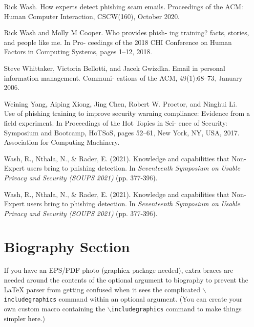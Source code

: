\documentclass[lettersize,journal]{IEEEtran}
\begin{document}
\begin{thebibliography}{1}
  Rick Wash. How experts detect phishing scam emails. Proceedings of the ACM: Human Computer Interaction, CSCW(160), October 2020.

  Rick Wash and Molly M Cooper. Who provides phish-
  ing training? facts, stories, and people like me. In Pro-
  ceedings of the 2018 CHI Conference on Human Factors
  in Computing Systems, pages 1–12, 2018.

  Steve Whittaker, Victoria Bellotti, and Jacek Gwizdka.
  Email in personal information management. Communi-
  cations of the ACM, 49(1):68–73, January 2006.

  Weining Yang, Aiping Xiong, Jing Chen, Robert W.
  Proctor, and Ninghui Li. Use of phishing training to
  improve security warning compliance: Evidence from a
  field experiment. In Proceedings of the Hot Topics in Sci-
  ence of Security: Symposium and Bootcamp, HoTSoS,
  pages 52–61, New York, NY, USA, 2017. Association
  for Computing Machinery.

  Wash, R., Nthala, N., & Rader, E. (2021). Knowledge and capabilities that {Non-Expert} users bring to phishing detection. In \textit{Seventeenth Symposium on Usable Privacy and Security (SOUPS 2021)} (pp. 377-396).

  Wash, R., Nthala, N., & Rader, E. (2021). Knowledge and capabilities that {Non-Expert} users bring to phishing detection. In \textit{Seventeenth Symposium on Usable Privacy and Security (SOUPS 2021)} (pp. 377-396).

\end{thebibliography}

\newpage

\section{Biography Section}
If you have an EPS/PDF photo (graphicx package needed), extra braces are needed
around the contents of the optional argument to biography to prevent the LaTeX
parser from getting confused when it sees the complicated
$\backslash${\tt{includegraphics}} command within an optional argument. (You
can create your own custom macro containing the
$\backslash${\tt{includegraphics}} command to make things simpler here.)

\vspace{11pt}
\end{document}
